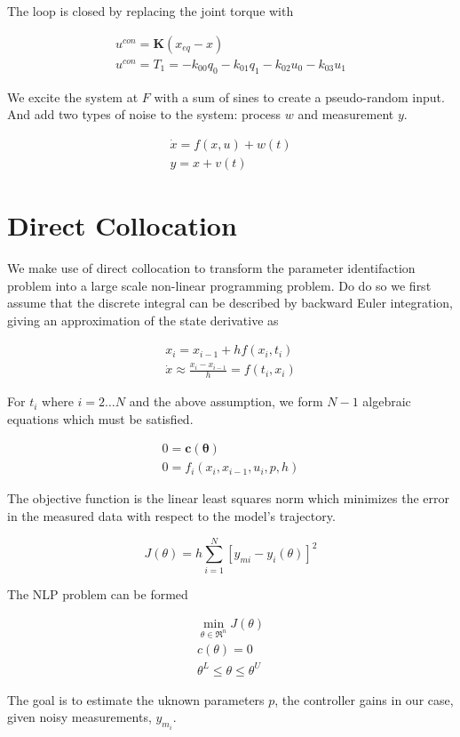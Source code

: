 \documentclass{article}
\begin{document}

The loop is closed by replacing the joint torque with

\begin{align}
   u^{con} = \mathbf{K} (x_{eq} - x) \\
   u^{con} = T_{1} = -k_{00} q_0 - k_{01} q_1 - k_{02} u_0 - k_{03} u_1
\end{align}

We excite the system at $F$ with a sum of sines to create a pseudo-random
input. And add two types of noise to the system: process $w$ and measurement
$y$.

\begin{align}
  \dot{x} = f(x, u) + w(t) \\
  y = x + v(t)
\end{align}

\section{Direct Collocation}

We make use of direct collocation to transform the parameter identifaction
problem into a large scale non-linear programming problem. Do do so we first
assume that the discrete integral can be described by backward Euler
integration, giving an approximation of the state derivative as

\begin{align}
  x_{i} = x_{i-1} + h f(x_{i}, t_{i}) \\
  \dot{x} \approx \frac{x_i - x_{i-1}}{h} =  f(t_i, x_i)
\end{align}

For $t_i$ where $i=2 \dots N$ and the above assumption, we form $N-1$ algebraic
equations which must be satisfied.

\begin{align}
  0 = \mathbf{c}(\mathbf{\theta}) \\
  0 = f_i(x_{i}, x_{i-1}, u_i, p, h)
\end{align}

The objective function is the linear least squares norm which minimizes the
error in the measured data with respect to the model's trajectory.

\begin{equation}
  J(\theta) = h \sum_{i=1}^N \left[y_{mi} - y_i(\theta)\right]^2
\end{equation}

The NLP problem can be formed

\begin{align}
  \min_{\theta \in \Re^{n}}  J(\theta) \\
  c(\theta) = 0 \\
  \theta^L \leq \theta \leq \theta^U
\end{align}

The goal is to estimate the uknown parameters $p$, the controller gains in our
case, given noisy measurements, $y_m_i$.
\end{document}
